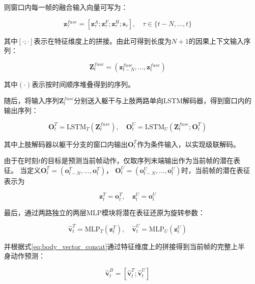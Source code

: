 则窗口内每一帧的融合输入向量可写为：

\begin{equation}
\bm{z}_\tau^{fuse} = [\bm{z}_\tau^{A}; \bm{z}_\tau^{F}; \bm{z}_\tau^{H}; \bm{s}_\tau],
\quad \tau \in \{t-N,\ldots,t\}
\label{eq:fuse_per_frame}
\end{equation}

其中$[\cdot;\cdot]$表示在特征维度上的拼接。由此可得到长度为$N{+}1$的因果上下文输入序列：

\begin{equation}
\bm{Z}_t^{fuse} = (\bm{z}_{t-N}^{fuse}, \ldots, \bm{z}_{t}^{fuse})
\label{eq:fuse_sequence}
\end{equation}

其中$(\cdot)$表示按时间顺序堆叠得到的序列。

随后，将输入序列$\bm{Z}_t^{fuse}$分别送入躯干与上肢两路单向LSTM解码器，得到窗口内的输出序列：

\begin{equation}
\bm{O}_t^{T} = \mathrm{LSTM}_{T}(\bm{Z}_t^{fuse}), \quad
\bm{O}_t^{U} = \mathrm{LSTM}_{U}(\bm{Z}_t^{fuse}; \bm{O}_t^{T})
\label{eq:lstm_outputs_seq}
\end{equation}

其中上肢解码器以躯干分支的窗口内输出$\bm{O}_t^T$作为条件输入，以实现级联解码。

由于在时刻$t$的目标是预测当前帧动作，仅取序列末端输出作为当前帧的潜在表征。
当定义$\bm{O}_t^{T} = (\bm{o}_{t-N}^{T},\ldots,\bm{o}_{t}^{T})$，
$\bm{O}_t^{U} = (\bm{o}_{t-N}^{U},\ldots,\bm{o}_{t}^{U})$时，当前帧的潜在表征表示为

\begin{equation}
\bm{z}_t^{T} = \bm{o}_t^{T}, \quad
\bm{z}_t^{U} = \bm{o}_t^{U}
\label{eq:last_step_repr}
\end{equation}

最后，通过两路独立的两层MLP模块将潜在表征还原为旋转参数：

\begin{equation}
\hat{\bm{v}}_t^{T} = \mathrm{MLP}_{T}(\bm{z}_t^{T}), \quad
\hat{\bm{v}}_t^{U} = \mathrm{MLP}_{U}(\bm{z}_t^{U})
\label{eq:decode_tu}
\end{equation}

并根据式\eqref{eq:body_vector_concat}通过特征维度上的拼接得到当前帧的完整上半身动作预测：

\begin{equation}
\hat{\bm{v}}_t^{B} = [\hat{\bm{v}}_t^{T}; \hat{\bm{v}}_t^{U}]
\label{eq:decode_body}
\end{equation}

